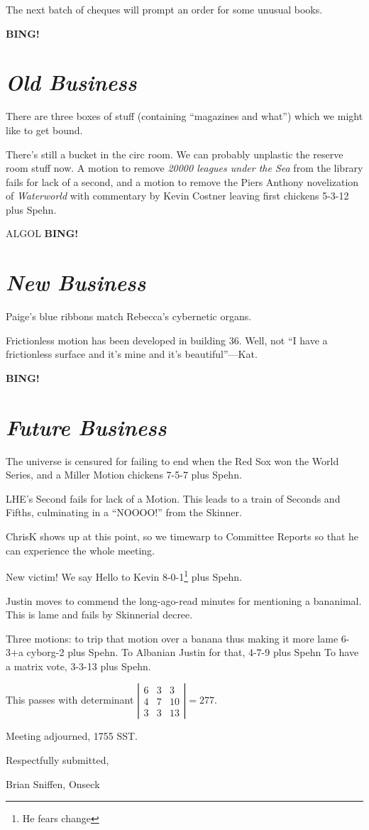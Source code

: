\documentclass[10pt]{article}
\newcommand{\bing}{{\bf BING!} }
\newcommand{\goto}[1]{\bing \vskip 12pt \section*{{\em{#1}}}}
\newcommand{\ps}{ plus Spehn\xspace}
\begin{document}
The next batch of cheques will prompt an order for some unusual books.

\goto{Old Business}

There are three boxes of stuff (containing ``magazines and what'')
which we might like to get bound.

There's still a bucket in the circ room.  We can probably unplastic
the reserve room stuff now.  A motion to remove \emph{20000 leagues
  under the Sea} from the library fails for lack of a second, and a
motion to remove the Piers Anthony novelization of \emph{Waterworld}
with commentary by Kevin Costner leaving first chickens 5-3-12\ps.

ALGOL
\goto{New Business}

Paige's blue ribbons match Rebecca's cybernetic organs.

Frictionless motion has been developed in building 36.
Well, not ``I have a frictionless surface and it's mine and it's beautiful''---Kat.

\goto{Future Business}

The universe is censured for failing to end when the Red Sox won the
World Series, and a Miller Motion chickens 7-5-7\ps.

LHE's Second fails for lack of a Motion.  This leads to a train of
Seconds and Fifths, culminating in a ``NOOOO!'' from the Skinner.

ChrisK shows up at this point, so we timewarp to Committee Reports so
that he can experience the whole meeting.

New victim!  We say Hello to Kevin 8-0-1\footnote{He fears change}\ps.

Justin moves to commend the long-ago-read minutes for mentioning a
bananimal.  This is lame and fails by Skinnerial decree.

Three motions:  to trip that motion over a banana thus making it more
lame 6-3+a cyborg-2\ps.
To Albanian Justin for that, 4-7-9\ps
To have a matrix vote, 3-3-13\ps.

This passes with determinant $\left| \begin{array}{ccc} 6 & 3 & 3 \\ 4 & 7 &
    10 \\ 3 & 3 & 13 \end{array} \right| = 277$.

\vspace{12pt}

\noindent
Meeting adjourned, 1755 SST.

\vspace{18pt}

\centerline{Respectfully submitted,}
\centerline{Brian Sniffen, Onseck}
\end{document}
